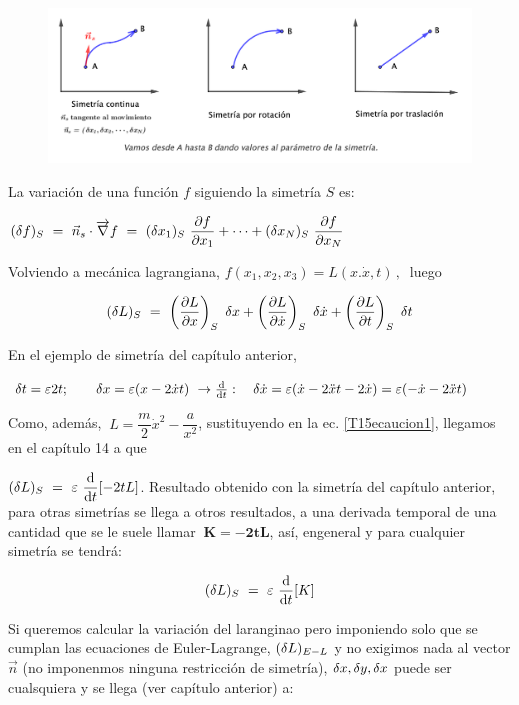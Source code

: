 \begin{figure}[H]
	\centering
	\includegraphics[width=.95\textwidth]{imagenes/img15-03.png}
\end{figure}

La variación de una función $f$ siguiendo la simetría $S$ es:

$(\var f)_S \ = \ \vec n_s \cdot \overrightarrow \nabla f \ = \
\displaystyle
(\var x_1)_S \ \pdv{f}{x_1} + \cdots + (\var x_N)_S \ \pdv{f}{x_N}$

Volviendo a mecánica lagrangiana, $ f(x_1,x_2,x_3) = L(x.\dot x, t)\, , \ $ luego

\begin{equation}
\label{T15ecaucion1}
(\var L)_S \ = \ \displaystyle
\left( \pdv{L}{x} \right)_S \ \var x +
\left( \pdv{L}{\dot x} \right)_S \ \var \dot x +
\left( \pdv{L}{t} \right)_S \ \var t 
\end{equation}

En el ejemplo de simetría del capítulo anterior, 

$\var t=\varepsilon 2t;\qquad \var x= \varepsilon (x-2\dot x t) \ \to \dv{t}:\quad \var \dot x=\varepsilon(\dot x-2\ddot xt-2\dot x)=\varepsilon (-\dot x-2\ddot x t)$

Como, además, $\ L=\dfrac m 2 \dot x^2 - \dfrac {a}{x^2}$, sustituyendo en la ec. \ref{T15ecaucion1}, llegamos en el capítulo 14 a que

\vspace{5mm} $(\var L)_S \ = \ \varepsilon \ \displaystyle \dv{t} [-2tL]$. Resultado obtenido con la simetría del capítulo anterior, para otras simetrías se llega a otros resultados, a una derivada temporal de una cantidad que se le suele llamar $\ \boldsymbol{K=-2tL}$, así, engeneral y para cualquier simetría se tendrá:

\begin{equation}
\label{T15paraTN1}	
(\var L)_S \ = \ \varepsilon \ \dv{t} [K]
\end{equation}

\vspace{5mm} Si queremos calcular la variación del laranginao pero imponiendo solo que se cumplan las ecuaciones de Euler-Lagrange, $(\var L)_{E-L}$ y no exigimos nada al vector $\vec n$ (no imponenmos ninguna restricción de simetría), $\var x, \var y, \var x$ puede ser cualsquiera y se llega (ver capítulo anterior) a:

